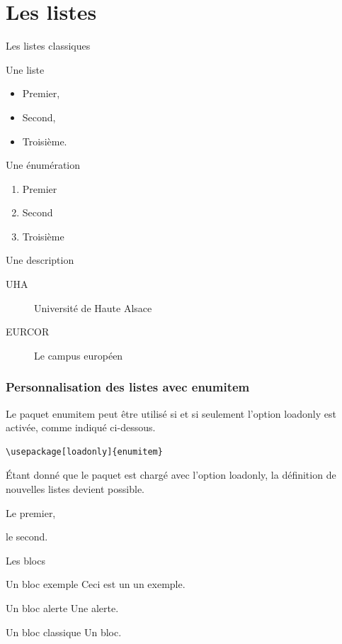 \documentclass[9pt]{beamer}
\begin{document}
\section{Les listes}
%
\begin{frame}{Les listes classiques}
 	\begin{minipage}[t]{0.45\linewidth}
 		\alert{Une liste}
 		\begin{itemize}
 				\item Premier,
 				\item Second,
				\item Troisième.
 		\end{itemize}
 	\end{minipage}
	\hfill
	\begin{minipage}[t]{0.45\linewidth}
		\alert{Une énumération}
		\begin{enumerate}
				\item Premier
				\item Second
				\item Troisième
		\end{enumerate}
	\end{minipage}

	\vspace{2em}

	\alert{Une description}
	\begin{description}
			\item [UHA] Université de Haute Alsace
			\item [EURCOR] Le campus européen
	\end{description}
\end{frame}
%
\begin{frame}[fragile]
	\frametitle{Personnalisation des listes avec enumitem}
	Le paquet \alert{enumitem} peut être utilisé si et si seulement l'option \alert{loadonly} est activée, comme indiqué ci-dessous.
\begin{verbatim}
\usepackage[loadonly]{enumitem}
\end{verbatim}
	\'Etant donné que le paquet est chargé avec l'option \alert{loadonly}, la définition de nouvelles listes devient possible.
	\begin{perso}
			\item Le premier,
			\item le second.
	\end{perso}
\end{frame}
%
\begin{frame}{Les blocs}
	\begin{exampleblock}{Un bloc exemple}
		Ceci est un un exemple.
	\end{exampleblock}

	\begin{alertblock}{Un bloc alerte}
		Une alerte.
	\end{alertblock}

	\begin{block}{Un bloc classique}
		Un bloc.
	\end{block}
\end{frame}
\end{document}
